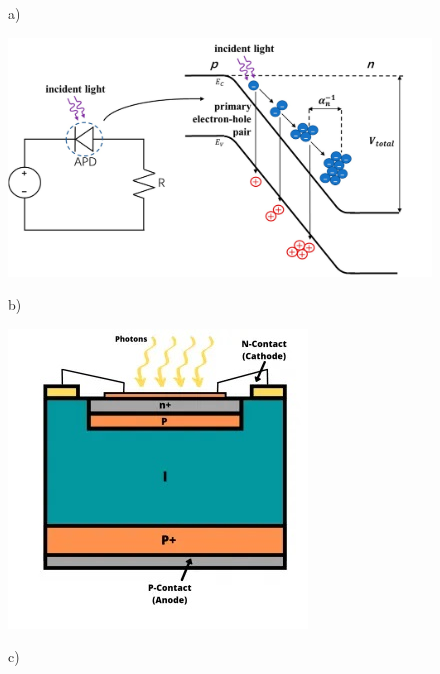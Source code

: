 \begin{figure}[tbh]
	\centering
	a)
	\begin{minipage}{.45\textwidth}
		\includegraphics[width=\linewidth]{./ImageFiles/APD.jpg}
	\end{minipage}
	b)
	\begin{minipage}{.45\textwidth}
		\includegraphics[width=\linewidth]{./ImageFiles/apd_2D.jpg}
	\end{minipage}
	c)
	\begin{minipage}{.45\textwidth}

\end{minipage}
\end{figure}
